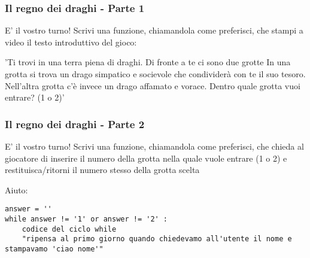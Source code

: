 \begin{frame}[fragile]
\frametitle{Il regno dei draghi - Parte 1}

\begin{block}{E' il vostro turno!}
Scrivi una funzione, chiamandola come preferisci, che stampi a video il testo introduttivo del gioco:\newline
        
        'Ti trovi in una terra piena di draghi.\newline
        Di fronte a te ci sono due grotte\newline
        In una grotta si trova un drago simpatico e socievole che condividerà con te il suo tesoro.\newline
        Nell'altra grotta c'è invece un drago affamato e vorace.\newline
        Dentro quale grotta vuoi entrare? (1 o 2)'
\end{block}

\end{frame}

\begin{frame}[fragile]
\frametitle{Il regno dei draghi - Parte 2}

\begin{block}{E' il vostro turno!}
Scrivi una funzione, chiamandola come preferisci, che chieda al giocatore di inserire il numero della grotta nella quale vuole entrare (1 o 2) e restituisca/ritorni il numero stesso della grotta scelta 

Aiuto:
\end{block}

    \begin{lstlisting}
answer = ''
while answer != '1' or answer != '2' :
    codice del ciclo while
    "ripensa al primo giorno quando chiedevamo all'utente il nome e stampavamo 'ciao nome'"
    \end{lstlisting}
\end{frame}

